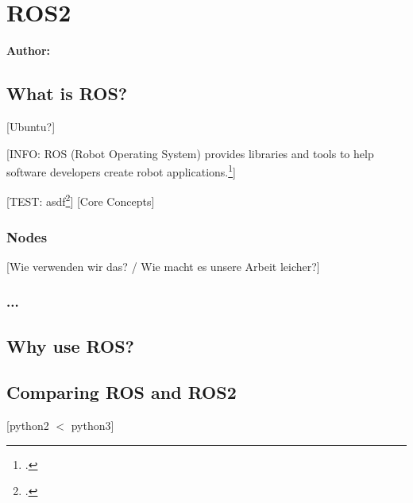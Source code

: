 \chapter{ROS2}

\textbf{Author: } 

\section{What is ROS?}
[Ubuntu?]

[INFO: ROS (Robot Operating System) provides libraries and tools to help software developers create robot applications.\footcite{roswiki}]

[TEST: asdf\footcite{roswiki}]
[Core Concepts]

\subsection{Nodes}
[Wie verwenden wir das? / Wie macht es unsere Arbeit leicher?]

\subsection{...}

\section{Why use ROS?}

\section{Comparing ROS and ROS2}
[python2 $<$ python3]

\filbreak